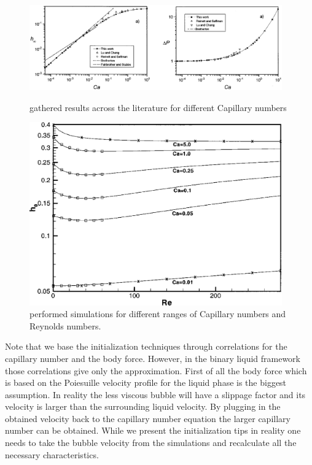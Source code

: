 \documentclass{article}
\begin{document}
\begin{figure}
\includegraphics[width=0.97\textwidth]{Figures/giavedoni_planar.eps}
\caption{\citet{giavedoni-numerical} gathered results across the
literature for different Capillary numbers \label{fig:giavedoni:planar}}
\includegraphics[width=0.97\textwidth]{Figures/heil-planar.eps}
\caption{\citet{heil-bretherton} performed simulations for different ranges of
Capillary numbers and Reynolds numbers. \label{fig:heil:planar}}
\end{figure}
Note that we base the initialization techniques through correlations for the
capillary number and the body force. However, in the binary liquid framework
those correlations give only the approximation. First of all the body force
which is based on the Poiesuille velocity profile for the liquid phase is the
biggest assumption. In reality the less viscous bubble will have a slippage
factor and its velocity is larger than the surrounding liquid velocity. By
plugging in the obtained velocity back to the capillary number equation the
larger capillary number can be obtained. While we present the initialization
tips in reality one needs to take the bubble velocity from the simulations and
recalculate all the necessary characteristics. 
\end{document}

